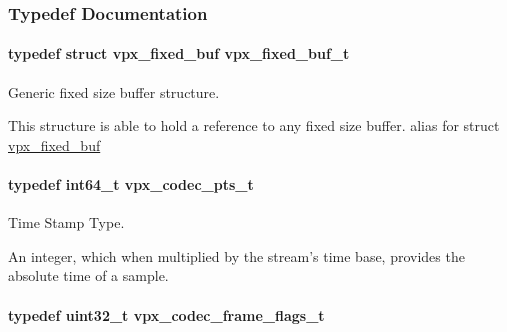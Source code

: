\subsubsection{\-Typedef \-Documentation}
\hypertarget{group__encoder_ga21fab7dd28065f349c97165501223764}{
\paragraph[{vpx\-\_\-fixed\-\_\-buf\-\_\-t}]{\setlength{\rightskip}{0pt plus 5cm}typedef struct {\bf vpx\-\_\-fixed\-\_\-buf}  {\bf vpx\-\_\-fixed\-\_\-buf\-\_\-t}}}\label{group__encoder_ga21fab7dd28065f349c97165501223764}


\-Generic fixed size buffer structure. 

\-This structure is able to hold a reference to any fixed size buffer. alias for struct \hyperlink{structvpx__fixed__buf}{vpx\-\_\-fixed\-\_\-buf} \hypertarget{group__encoder_ga7e711b0a71c65aef8f0faea8bd57b05f}{
\paragraph[{vpx\-\_\-codec\-\_\-pts\-\_\-t}]{\setlength{\rightskip}{0pt plus 5cm}typedef int64\-\_\-t {\bf vpx\-\_\-codec\-\_\-pts\-\_\-t}}}\label{group__encoder_ga7e711b0a71c65aef8f0faea8bd57b05f}


\-Time \-Stamp \-Type. 

\-An integer, which when multiplied by the stream's time base, provides the absolute time of a sample. \hypertarget{group__encoder_gaac8ee319b9a6175f6946f59437c7ae4b}{
\paragraph[{vpx\-\_\-codec\-\_\-frame\-\_\-flags\-\_\-t}]{\setlength{\rightskip}{0pt plus 5cm}typedef uint32\-\_\-t {\bf vpx\-\_\-codec\-\_\-frame\-\_\-flags\-\_\-t}}}\label{group__encoder_gaac8ee319b9a6175f6946f59437c7ae4b}


